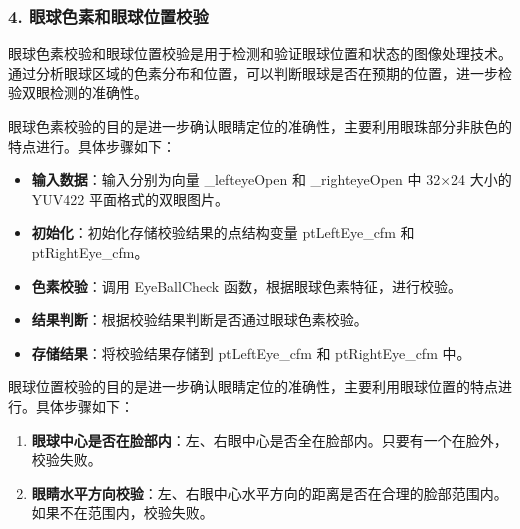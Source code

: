 \documentclass[12pt,hyperref,a4paper,UTF8]{ctexart}
\begin{document}
        \subsubsection*{\large \textbf{4. 眼球色素和眼球位置校验}}


        眼球色素校验和眼球位置校验是用于检测和验证眼球位置和状态的图像处理技术。通过分析眼球区域的色素分布和位置，可以判断眼球是否在预期的位置，进一步检验双眼检测的准确性。

        眼球色素校验的目的是进一步确认眼睛定位的准确性，主要利用眼珠部分非肤色的特点进行。具体步骤如下：

        \begin{itemize}
            \item \textbf{输入数据}：输入分别为向量 \_lefteyeOpen 和 \_righteyeOpen 中 32×24 大小的 YUV422 平面格式的双眼图片。
            \item \textbf{初始化}：初始化存储校验结果的点结构变量 ptLeftEye\_cfm 和 ptRightEye\_cfm。
            \item \textbf{色素校验}：调用 EyeBallCheck 函数，根据眼球色素特征，进行校验。
            \item \textbf{结果判断}：根据校验结果判断是否通过眼球色素校验。
            \item \textbf{存储结果}：将校验结果存储到 ptLeftEye\_cfm 和 ptRightEye\_cfm 中。
        \end{itemize}

        眼球位置校验的目的是进一步确认眼睛定位的准确性，主要利用眼球位置的特点进行。具体步骤如下：

        \begin{enumerate}
            \item \textbf{眼球中心是否在脸部内}：左、右眼中心是否全在脸部内。只要有一个在脸外，校验失败。
            \item \textbf{眼睛水平方向校验}：左、右眼中心水平方向的距离是否在合理的脸部范围内。如果不在范围内，校验失败。
        \end{enumerate}
\end{document}
